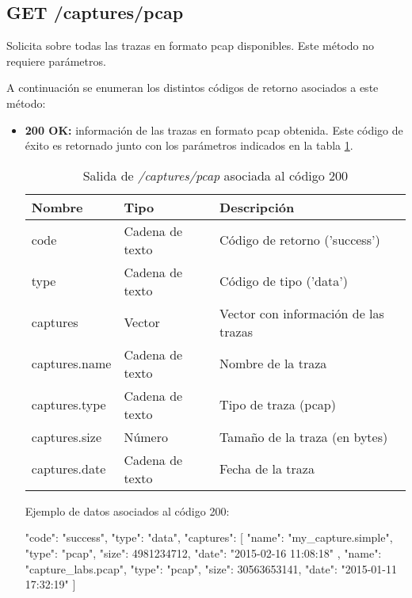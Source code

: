 %
%
\subsection{GET /captures/pcap}
Solicita sobre todas las \glspl{traza} en formato \gls{pcap} disponibles. Este método no requiere parámetros.

A continuación se enumeran los distintos códigos de retorno asociados a este método:
\begin{itemize}

\item{\textbf{200 OK:} información de las \glspl{traza} en formato \gls{pcap} obtenida. Este código de éxito es retornado junto con los parámetros indicados en la tabla \ref{extra:api:capturespcap:ok}.
\begin{table}[H]
\centering
\begin{tabular}{|l|l|l|}
\hline
\rowcolor[HTML]{F5F5F5}
\textbf{Nombre}                & \textbf{Tipo}   & \textbf{Descripción}                            \\ \hline
code                           & Cadena de texto & Código de retorno ('success')                   \\ \hline
type                           & Cadena de texto & Código de tipo ('data')                         \\ \hline
captures                       & Vector          & Vector con información de las \glspl{traza}     \\ \hline
captures.name                  & Cadena de texto & Nombre de la \gls{traza}                        \\ \hline
captures.type                  & Cadena de texto & Tipo de \gls{traza} (\gls{pcap})                \\ \hline
captures.size                  & Número          & Tamaño de la \gls{traza} (en bytes)             \\ \hline
captures.date                  & Cadena de texto & Fecha de la \gls{traza}                         \\ \hline
\end{tabular}
\caption{Salida de \textit{/captures/pcap} asociada al código 200}
\label{extra:api:capturespcap:ok}
\end{table}
\begin{minipage}{\textwidth}
Ejemplo de datos asociados al código 200:

\begin{code}[language=json]
{
  "code": "success",
  "type": "data",
  "captures": [
    {
      "name": "my_capture.simple",
      "type": "pcap",
      "size": 4981234712,
      "date": "2015-02-16 11:08:18"
    },
    {
      "name": "capture_labs.pcap",
      "type": "pcap",
      "size": 30563653141,
      "date": "2015-01-11 17:32:19"
    }
  ]
}
\end{code}
\end{minipage}
}

\end{itemize}

